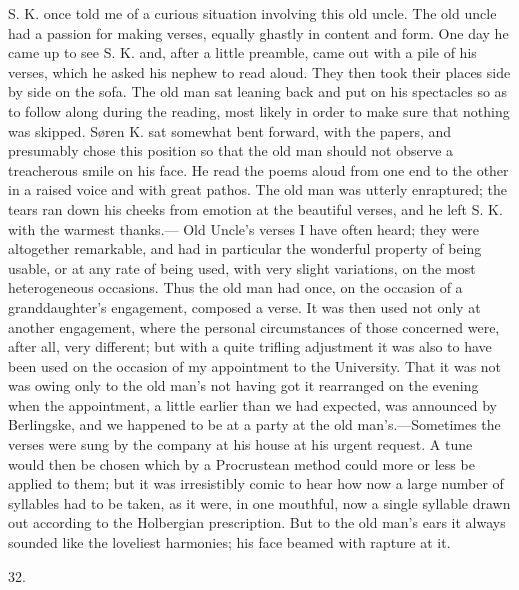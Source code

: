 \documentclass[12pt,a4paper,openany]{book}
\newcommand{\secnum}[1]{\par\begin{center}#1\end{center}\par\nobreak}
\newcommand{\opage}[1]{\marginnote{\footnotesize\textit{[#1]}}}
\begin{document}
S. K. once told me of a curious situation involving this old uncle.
The old uncle had a passion
for making verses, equally ghastly in content
and form. One day he came up to see S. K. and, after a
little preamble, came out with a pile of his
verses, which he asked his nephew to read aloud. They then took
their places side by side on the sofa. The old man sat
leaning back and put on his spectacles so as to
follow along during the reading, most likely in order to
make sure that nothing was skipped. Søren K. sat
somewhat bent forward, with the papers, and presumably chose
this position so that the old man should not observe a
treacherous smile on his face. He read the poems
aloud from one end to the other in a raised voice and with great
pathos. The old man was utterly enraptured; the tears ran
down his cheeks from emotion at the beautiful verses,
and he left S. K. with the warmest thanks.---
Old Uncle's verses I have often heard; they were altogether
remarkable, and had in particular the wonderful property
of being usable, or at any rate
of being used, with very slight variations, on the most heterogeneous occasions.
Thus the old man had once, on the occasion of a
granddaughter's engagement, composed a verse. It was then
used not only at another engagement, where the personal
circumstances of those concerned were, after all, very different;
\opage{360}but with a quite trifling adjustment it was also
to have been used on the occasion of my appointment
to the University. That it was not was owing only
to the old man's not having got it rearranged on the
evening when the appointment, a little earlier than we had expected,
was announced by Berlingske, and we happened to be at a party at
the old man's.---Sometimes the verses were sung by the company
at his house at his urgent request. A
tune would then be chosen which by a Procrustean method
could more or less be applied to them; but it was irresistibly comic
to hear how now a large number of syllables
had to be taken, as it were, in one mouthful, now a single
syllable drawn out according to the Holbergian prescription.
But to the old man's ears it always sounded like the loveliest
harmonies; his face beamed with rapture
at it.

\secnum{32.}
\end{document}

